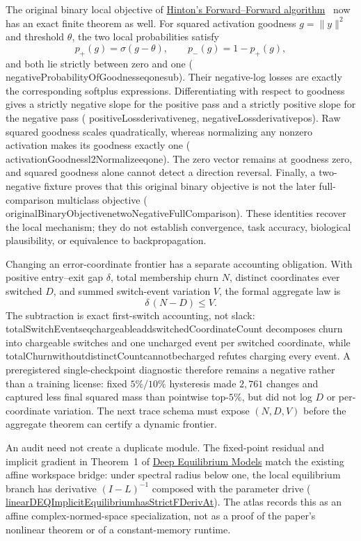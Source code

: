 \documentclass[11pt]{article}
\newcommand{\leanname}[1]{{\scriptsize\ttfamily
  \def\_{\textunderscore\allowbreak}#1}}
\newcommand{\formalcommit}{f3a31db36bb2f944312ee31c1d86c2758109e83a}
\newcommand{\leansource}[3]{%
  \href{https://github.com/zariuq/MeTTapedia/blob/\formalcommit/#1\#L#2}{\leanname{#3}}}
\begin{document}
The original binary local objective of
\href{https://arxiv.org/abs/2212.13345}{Hinton's Forward--Forward
algorithm}~\cite{hinton2022ff} now has an exact finite theorem as well.  For
squared activation goodness $g=\lVert y\rVert^2$ and threshold $\theta$, the
two local probabilities satisfy
\[
 p_{+}(g)=\sigma(g-\theta),\qquad
 p_{-}(g)=1-p_{+}(g),
\]
and both lie strictly between zero and one
(\leanname{negativeProbabilityOfGoodness\_eq\_one\_sub}).  Their negative-log
losses are exactly the corresponding softplus expressions.  Differentiating
with respect to goodness gives a strictly negative slope for the positive pass
and a strictly positive slope for the negative pass
(\leanname{positiveLoss\_derivative\_neg},
\leanname{negativeLoss\_derivative\_pos}).  Raw squared goodness scales
quadratically, whereas normalizing any nonzero activation makes its goodness
exactly one
(\leanname{activationGoodness\_l2Normalize\_eq\_one}).  The zero vector remains
at goodness zero, and squared goodness alone cannot detect a direction
reversal.  Finally, a two-negative fixture proves that this original binary
objective is not the later full-comparison multiclass objective
(\leanname{originalBinaryObjective\_ne\_twoNegativeFullComparison}).  These
identities recover the local mechanism; they do not establish convergence,
task accuracy, biological plausibility, or equivalence to backpropagation.

Changing an error-coordinate frontier has a separate accounting obligation. With
positive entry--exit gap $\delta$, total membership churn $N$, distinct coordinates
ever switched $D$, and summed switch-event variation $V$, the formal aggregate law is
\[
  \delta\,(N-D)\leq V.
\]
The subtraction is exact first-switch accounting, not slack:
\leanname{totalSwitchEvents\_eq\_chargeable\_add\_switchedCoordinateCount}
decomposes churn into chargeable switches and one uncharged event per switched
coordinate, while
\leanname{totalChurn\_without\_distinctCount\_cannot\_be\_charged}
refutes charging every event. A preregistered single-checkpoint diagnostic therefore
remains a negative rather than a training license: fixed $5\%/10\%$ hysteresis made
$2{,}761$ changes and captured less final squared mass than pointwise top-$5\%$, but
did not log $D$ or per-coordinate variation. The next trace schema must expose
$(N,D,V)$ before the aggregate theorem can certify a dynamic frontier.

An audit need not create a duplicate module. The fixed-point residual and implicit
gradient in Theorem~1 of
\href{https://arxiv.org/abs/1909.01377}{Deep Equilibrium Models} match the existing
affine workspace bridge: under spectral radius below one, the local equilibrium branch
has derivative $(I-L)^{-1}$ composed with the parameter drive
(\leansource{lean/mettapedia/Mettapedia/MachineLearning/NeuralNetworks/WorkspaceDecoder/DEQBridge.lean}{242-L265}{linearDEQImplicitEquilibrium\_hasStrictFDerivAt}).
The atlas records this as an affine complex-normed-space specialization, not as a proof
of the paper's nonlinear theorem or of a constant-memory runtime.
\end{document}
